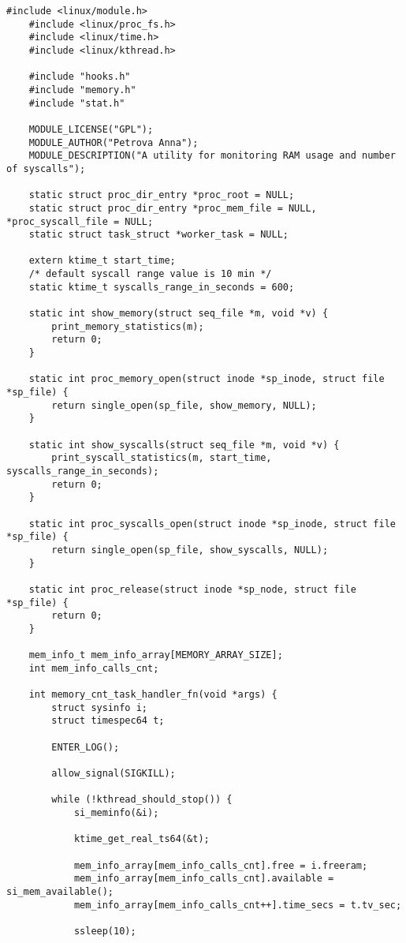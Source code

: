 
\begin{lstlisting}[caption={листинг файла monitor\_main.c}]
	#include <linux/module.h>
	#include <linux/proc_fs.h> 
	#include <linux/time.h>
	#include <linux/kthread.h>
	
	#include "hooks.h"
	#include "memory.h"
	#include "stat.h"
	
	MODULE_LICENSE("GPL");
	MODULE_AUTHOR("Petrova Anna");
	MODULE_DESCRIPTION("A utility for monitoring RAM usage and number of syscalls");
	
	static struct proc_dir_entry *proc_root = NULL;
	static struct proc_dir_entry *proc_mem_file = NULL, *proc_syscall_file = NULL;
	static struct task_struct *worker_task = NULL;
	
	extern ktime_t start_time;
	/* default syscall range value is 10 min */
	static ktime_t syscalls_range_in_seconds = 600;
	
	static int show_memory(struct seq_file *m, void *v) {
		print_memory_statistics(m);
		return 0;
	}
	
	static int proc_memory_open(struct inode *sp_inode, struct file *sp_file) {
		return single_open(sp_file, show_memory, NULL);
	}
	
	static int show_syscalls(struct seq_file *m, void *v) {
		print_syscall_statistics(m, start_time, syscalls_range_in_seconds);
		return 0;
	}
	
	static int proc_syscalls_open(struct inode *sp_inode, struct file *sp_file) {
		return single_open(sp_file, show_syscalls, NULL);
	}
	
	static int proc_release(struct inode *sp_node, struct file *sp_file) {
		return 0;
	}
	
	mem_info_t mem_info_array[MEMORY_ARRAY_SIZE];
	int mem_info_calls_cnt;
	
	int memory_cnt_task_handler_fn(void *args) {
		struct sysinfo i;
		struct timespec64 t;
		
		ENTER_LOG();
		
		allow_signal(SIGKILL);
		
		while (!kthread_should_stop()) {
			si_meminfo(&i);
			
			ktime_get_real_ts64(&t);
			
			mem_info_array[mem_info_calls_cnt].free = i.freeram;
			mem_info_array[mem_info_calls_cnt].available = si_mem_available();
			mem_info_array[mem_info_calls_cnt++].time_secs = t.tv_sec;
			
			ssleep(10);
			

\end{lstlisting}
